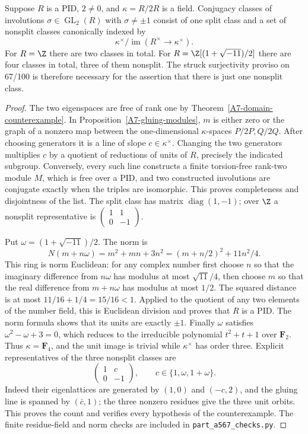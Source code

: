 \begin{proposition}\label{A7-PID-count}
Suppose $R$ is a PID, $2\ne0$, and $\kappa=R/2R$ is a field. Conjugacy classes of involutions $\sigma\in\operatorname{GL}_2(R)$ with $\sigma\ne\pm1$ consist of one split class and a set of nonsplit classes canonically indexed by
\[
 \kappa^\times/\operatorname{im}(R^\times\to\kappa^\times).
\]
For $R=\Z$ there are two classes in total. For
$R=\Z[(1+\sqrt{-11})/2]$ there are four classes in total, three of them nonsplit. The struck surjectivity proviso on 67/100 is therefore necessary for the assertion that there is just one nonsplit class.
\end{proposition}
\begin{proof}
The two eigenspaces are free of rank one by Theorem~\ref{A7-domain-counterexample}. In Proposition~\ref{A7-gluing-modules}, $m$ is either zero or the graph of a nonzero map between the one-dimensional $\kappa$-spaces $P/2P,Q/2Q$. After choosing generators it is a line of slope $c\in\kappa^\times$. Changing the two generators multiplies $c$ by a quotient of reductions of units of $R$, precisely the indicated subgroup. Conversely, every such line constructs a finite torsion-free rank-two module $M$, which is free over a PID, and two constructed involutions are conjugate exactly when the triples are isomorphic. This proves completeness and disjointness of the list. The split class has matrix $\operatorname{diag}(1,-1)$; over $\Z$ a nonsplit representative is $\left(\begin{smallmatrix}1&1\\0&-1\end{smallmatrix}\right)$.

Put $\omega=(1+\sqrt{-11})/2$. The norm is
\[
 N(m+n\omega)=m^2+mn+3n^2=(m+n/2)^2+11n^2/4.
\]
This ring is norm Euclidean: for any complex number first choose $n$ so that the imaginary difference from $n\omega$ has modulus at most $\sqrt{11}/4$, then choose $m$ so that the real difference from $m+n\omega$ has modulus at most $1/2$. The squared distance is at most $11/16+1/4=15/16<1$. Applied to the quotient of any two elements of the number field, this is Euclidean division and proves that $R$ is a PID. The norm formula shows that its units are exactly $\pm1$. Finally $\omega$ satisfies $\omega^2-\omega+3=0$, which reduces to the irreducible polynomial $t^2+t+1$ over $\mathbf F_2$. Thus $\kappa=\mathbf F_4$, and the unit image is trivial while $\kappa^\times$ has order three. Explicit representatives of the three nonsplit classes are
\[
 \begin{pmatrix}1&c\\0&-1\end{pmatrix},
 \qquad c\in\{1,\omega,1+\omega\}.
\]
Indeed their eigenlattices are generated by $(1,0)$ and $(-c,2)$, and the gluing line is spanned by $(\bar{c},1)$; the three nonzero residues give the three unit orbits. This proves the count and verifies every hypothesis of the counterexample. The finite residue-field and norm checks are included in \texttt{part\_a567\_checks.py}.
\end{proof}

